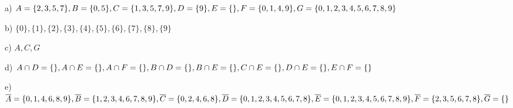 {a) $A = \{2, 3, 5, 7\}, B = \{0, 5\}, C = \{1, 3, 5, 7, 9\}, D = \{9\}, E = \{\}, F = \{0, 1, 4, 9\},\\ G = \{0, 1, 2, 3, 4, 5, 6, 7, 8, 9\}$

b) $\{0\}, \{1\}, \{2\}, \{3\}, \{4\}, \{5\}, \{6\}, \{7\}, \{8\}, \{9\}$

c) $A, C, G$

d) $A \cap D = \{\}, A \cap E = \{\}, A \cap F = \{\}, B \cap D = \{\}, B \cap  E = \{\},\\ C \cap E = \{\}, D \cap E = \{\}, E  \cap F = \{\}$


e) $\overline{A} = \{0, 1, 4, 6, 8, 9\}, \overline{B} = \{1, 2, 3, 4, 6, 7, 8, 9\}, \overline{C} = \{0, 2, 4, 6, 8\}, \overline{D} = \{0, 1, 2, 3, 4, 5, 6, 7, 8\},\\
\overline{E} = \{0, 1, 2, 3, 4, 5, 6, 7, 8, 9\}, \overline{F} = \{2, 3, 5, 6, 7, 8\}, \overline{G} = \{\}$
}




